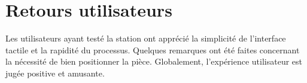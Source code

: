 \section{Retours utilisateurs}

Les utilisateurs ayant testé la station ont apprécié la simplicité de l'interface tactile et la rapidité du processus. Quelques remarques ont été faites concernant la nécessité de bien positionner la pièce. Globalement, l'expérience utilisateur est jugée positive et amusante.

